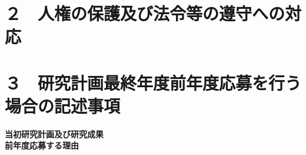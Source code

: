 \documentclass[11pt,a4j,dvipdfmx]{jarticle} 					%
\newcommand{\研究課題名}{加速器実験による短距離バリオン間相互作用の解明と中性子星ハイペロンパズルの解決}
\newcommand{\研究機関名}{東北大学}
\newcommand{\研究代表者氏名}{市川裕大}
\newcommand{\研究期間の最終元号年度}{13}
\begin{document}




\section{２　人権の保護及び法令等の遵守への対応}



\section{３　研究計画最終年度前年度応募を行う場合の記述事項}
\newcommand{\最終年度研究種目名}{基盤研究（）}
\newcommand{\最終年度研究課題番号}{?????}
\newcommand{\最終年度研究課題名}{}
\newcommand{\最終年度研究期間}{令和？？年度〜令和\一年目 年度}


\noindent
\textbf{当初研究計画及び研究成果}\\
\noindent
\textbf{前年度応募する理由}\\




\end{document}
